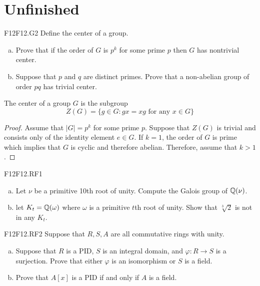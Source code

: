 \documentclass[../AlgebraQualSolutions.tex]{subfiles}
\begin{document}
\section{Unfinished}
	
	\begin{prob}{F12}{F12.G2}
	Define the center of a group.
	\begin{enumerate}[(a)]
	\item Prove that if the order of $G$ is $p^k$ for some prime $p$ then $G$ has nontrivial center.
	\item Suppose that $p$ and $q$ are distinct primes. Prove that a non-abelian group of order $pq$ has trivial center.
	\end{enumerate}
	\end{prob}
	
	The center of a group $G$ is the subgroup
		\[Z(G) = \{g \in G: gx = xg \textrm{ for any $x \in G$} \} \]
	
	\begin{proof}
	Assume that $|G| = p^k$ for some prime $p$. Suppose that $Z(G)$ is trivial and consists only of the identity element $e \in G$. If $k = 1$, the order of $G$ is prime which implies that $G$ is cyclic and therefore abelian. Therefore, assume that $k > 1$.
	\end{proof}
	
	\begin{prob}{F12}{F12.RF1}
	\begin{enumerate}[(a)]
	\item Let $\nu$ be a primitive 10th root of unity. Compute the Galois group of $\mathbb{Q}(\nu)$.
	\item let $K_t = \mathbb{Q}(\omega)$ where $\omega$ is a primitive $t$th root of unity. Show that $\sqrt[3]{2}$ is not in any $K_t$.
	\end{enumerate}
	\end{prob}
	
	\begin{prob}{F12}{F12.RF2}
	Suppose that $R,S,A$ are all commutative rings with unity.
	\begin{enumerate}[(a)]
	\item Suppose that $R$ is a PID, $S$ is an integral domain, and $\varphi:R \to S$ is a surjection. Prove that either $\varphi$ is an isomorphism or $S$ is a field.
	\item Prove that $A[x]$ is a PID if and only if $A$ is a field.
	\end{enumerate}
	\end{prob}
	
\end{document}
